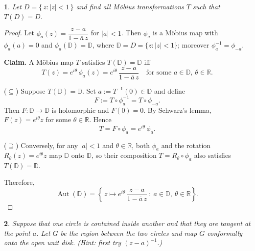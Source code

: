 \documentclass[12pt, a4paper]{report}
\theoremstyle{spaced}
\newtheorem{exercise}{}
\newcommand{\setexercise}[1]{\setcounter{exercise}{#1-1}}
\begin{document}
\setexercise{10}
\begin{exercise}
	Let \(D = \{\, z : |z| < 1 \,\}\) and find all Möbius transformations \(T\) such that \(T(D) = D\).
\end{exercise}

\begin{proof}
	Let \(\phi_a(z)=\dfrac{z-a}{1-\overline{a}\,z}\) for \(|a|<1\). Then \(\phi_a\) is a Möbius map with
	\(\phi_a(a)=0\) and \(\phi_a(\mathbb D)=\mathbb D\), where \(\mathbb D=D=\{z:|z|<1\}\); moreover
	\(\phi_a^{-1}=\phi_{-a}\).

	\textbf{Claim.} A Möbius map \(T\) satisfies \(T(\mathbb D)=\mathbb D\) iff
	\[
		T(z)=e^{i\theta}\,\phi_a(z)=e^{i\theta}\,\frac{z-a}{1-\overline{a}\,z}
		\quad\text{for some }a\in\mathbb D,\ \theta\in\mathbb R.
	\]

	(\(\subseteq\)) Suppose \(T(\mathbb D)=\mathbb D\). Set \(a:=T^{-1}(0)\in\mathbb D\) and define
	\[
		F:=T\circ\phi_a^{-1} = T\circ\phi_{-a}.
	\]
	Then \(F:\mathbb D\to\mathbb D\) is holomorphic and \(F(0)=0\).
	By Schwarz’s lemma, \(F(z)=e^{i\theta}z\) for some \(\theta\in\mathbb R\). Hence
	\[
		T = F\circ \phi_a = e^{i\theta}\,\phi_a.
	\]

	(\(\supseteq\)) Conversely, for any \(|a|<1\) and \(\theta\in\mathbb R\),
	both \(\phi_a\) and the rotation \(R_\theta(z)=e^{i\theta}z\) map \(\mathbb D\) onto \(\mathbb D\),
	so their composition \(T=R_\theta\circ\phi_a\) also satisfies \(T(\mathbb D)=\mathbb D\).

	Therefore,
	\[
		\operatorname{Aut}(\mathbb D)
		=
		\left\{
		\, z\mapsto e^{i\theta}\,\dfrac{z-a}{1-\overline{a}\,z}
		\ :\
		a\in\mathbb D,\ \theta\in\mathbb R
		\right\}.
	\]
\end{proof}


\setexercise{14}
\begin{exercise}
	Suppose that one circle is contained inside another and that they are tangent at the point \(a\).
	Let \(G\) be the region between the two circles and map \(G\) conformally onto the open unit disk.
	\emph{(Hint: first try \((z-a)^{-1}\).)}
\end{exercise}
\end{document}
